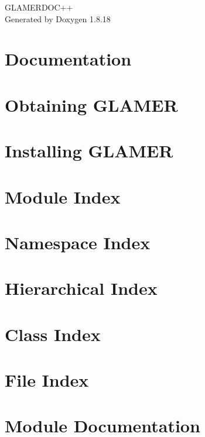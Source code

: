 \let\mypdfximage\pdfximage\def\pdfximage{\immediate\mypdfximage}\documentclass[twoside]{book}
\newcommand{\+}{\discretionary{\mbox{\scriptsize$\hookleftarrow$}}{}{}}
\newcommand{\clearemptydoublepage}{%
  \newpage{\pagestyle{empty}\cleardoublepage}%
}
\begin{document}
\hypersetup{pageanchor=false,
             bookmarksnumbered=true,
             pdfencoding=unicode
            }
\begin{titlepage}
\vspace*{7cm}
\begin{center}%
{\Large G\+L\+A\+M\+E\+R\+D\+O\+C++ }\\
\vspace*{1cm}
{\large Generated by Doxygen 1.8.18}\\
\end{center}
\end{titlepage}
\clearemptydoublepage
{}
\tableofcontents
\clearemptydoublepage
{}
\hypersetup{pageanchor=true}

\chapter{Documentation}
\label{index}\hypertarget{index}{}
\chapter{Obtaining G\+L\+A\+M\+ER}
\label{copying}

\chapter{Installing G\+L\+A\+M\+ER}
\label{install}

\chapter{Module Index}

\chapter{Namespace Index}

\chapter{Hierarchical Index}

\chapter{Class Index}

\chapter{File Index}

\chapter{Module Documentation}















\end{document}
